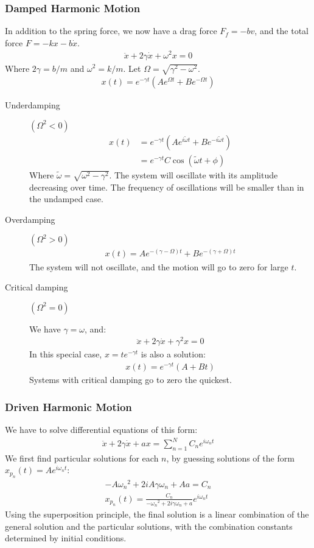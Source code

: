 \documentclass[11pt]{article}
\begin{document}
\begin{multicols*}{3}
\subsubsection*{Damped Harmonic Motion}
In addition to the spring force, we now have a drag force $F_f=-bv$, and the total force $F=-kx-b\dot{x}$.
	\begin{align*}
	\ddot{x} + 2\gamma\dot{x}+\omega^2x=0
	\end{align*}
Where $2\gamma=b/m$ and $\omega^2=k/m$. Let $\Omega = \sqrt{\gamma^2-\omega^2}$.
	\begin{align*}
	x(t)=e^{-\gamma t}(Ae^{\Omega t}+Be^{-\Omega t})
	\end{align*}
\begin{description}
\item [Underdamping] $(\Omega^2<0)$
	\begin{align*}
	x(t)&=e^{-\gamma t}(Ae^{i\tilde{\omega}t}+Be^{-i\tilde{\omega}t})\\
	&=e^{-\gamma t}C\cos(\tilde{\omega}t + \phi)
	\end{align*}
Where $\tilde{\omega}=\sqrt{\omega^2-\gamma^2}$. The system will oscillate with its amplitude decreasing over time. The frequency of oscillations will be smaller than in the undamped case.
\item[Overdamping] $(\Omega^2>0)$
	\begin{align*}
	x(t)=Ae^{-(\gamma-\Omega)t}+Be^{-(\gamma+\Omega)t}
	\end{align*}
The system will not oscillate, and the motion will go to zero for large $t$.
\item[Critical damping] $(\Omega^2=0)$

We have $\gamma=\omega$, and:
	\begin{align*}
	\ddot{x}+2\gamma\dot{x}+\gamma^2x=0
	\end{align*}
In this special case, $x=te^{-\gamma t}$ is also a solution:
	\begin{align*}
	x(t)=e^{-\gamma t}(A+Bt)
	\end{align*}
Systems with critical damping go to zero the quickest.
\end{description}
\subsubsection*{Driven Harmonic Motion}
We have to solve differential equations of this form:
	\begin{align*}
	\ddot{x}+2\gamma\dot{x}+ax=\sum_{n=1}^{N}{C_ne^{i\omega_nt}}
	\end{align*}
We first find particular solutions for each $n$, by guessing solutions of the form $x_{p_n}(t)=Ae^{i\omega_nt}$:
	\begin{align*}
	-A{\omega_n}^2+2iA\gamma\omega_n+Aa=C_n \\
	x_{p_n}(t)=\frac{C_n}{-{\omega_n}^2+2i\gamma\omega_n+a}e^{i\omega_nt}
	\end{align*}
Using the superposition principle, the final solution is a linear combination of the general solution and the particular solutions, with the combination constants determined by initial conditions.

\end{multicols*}
\end{document}
